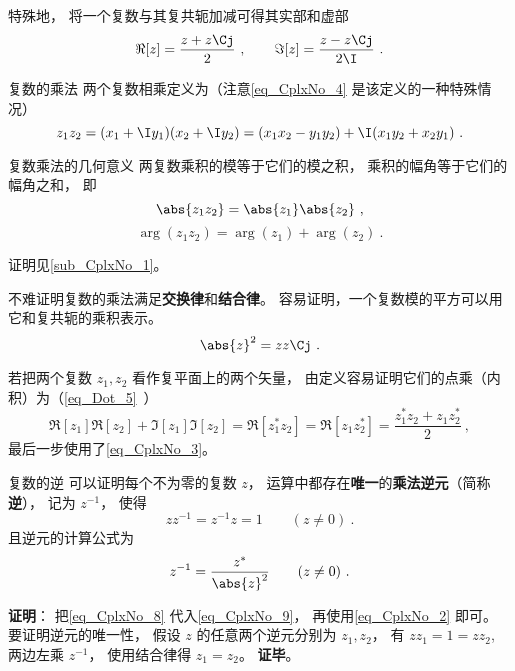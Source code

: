 特殊地， 将一个复数与其复共轭加减可得其实部和虚部
\begin{equation}\label{eq_CplxNo_3}
\Re[z] = \frac{z + z\Cj}{2} ~,\qquad
\Im[z] = \frac{z - z\Cj}{2\I}~.
\end{equation}

\begin{definition}{复数的乘法}
两个复数相乘定义为（注意\autoref{eq_CplxNo_4} 是该定义的一种特殊情况）
\begin{equation}
z_1z_2 = (x_1 + \I y_1)(x_2 + \I y_2) = (x_1 x_2 - y_1 y_2) + \I (x_1 y_2 + x_2 y_1)~.
\end{equation}
\end{definition}

\begin{theorem}{复数乘法的几何意义}
两复数乘积的模等于它们的模之积， 乘积的幅角等于它们的幅角之和， 即
\begin{equation}\label{eq_CplxNo_10}
\abs{z_1 z_2} = \abs{z_1}\abs{z_2}~,
\end{equation}
\begin{equation}
\arg(z_1 z_2) = \arg(z_1) + \arg(z_2)~.
\end{equation}
\end{theorem}
证明见\autoref{sub_CplxNo_1}。

不难证明复数的乘法满足\textbf{交换律}和\textbf{结合律}。 容易证明，一个复数模的平方可以用它和复共轭的乘积表示。
\begin{equation}\label{eq_CplxNo_2}
\abs{z}^2 = z z\Cj~.
\end{equation}

若把两个复数 $z_1, z_2$ 看作复平面上的两个矢量， 由定义容易证明它们的点乘（内积）为（\autoref{eq_Dot_5}~）
\begin{equation}
\Re[z_1] \Re[z_2] + \Im[z_1]\Im[z_2] = \Re[z_1^* z_2] = \Re[z_1 z_2^*] = \frac{z_1^* z_2 + z_1 z_2^*}{2}~,
\end{equation}
最后一步使用了\autoref{eq_CplxNo_3}。

\begin{definition}{复数的逆}
可以证明每个不为零的复数 $z$， 运算中都存在\textbf{唯一}的\textbf{乘法逆元}（简称\textbf{逆}）， 记为 $z^{-1}$， 使得
\begin{equation}\label{eq_CplxNo_9}
zz^{-1} = z^{-1}z = 1 \qquad (z \ne 0)~.
\end{equation}
且逆元的计算公式为
\begin{equation}\label{eq_CplxNo_8}
z^{-1} = \frac{z^*}{\abs{z}^2} \qquad (z \ne 0)~.
\end{equation}
\end{definition}
\textbf{证明}： 把\autoref{eq_CplxNo_8} 代入\autoref{eq_CplxNo_9}， 再使用\autoref{eq_CplxNo_2} 即可。 要证明逆元的唯一性， 假设 $z$ 的任意两个逆元分别为 $z_1, z_2$， 有 $zz_1 = 1 = zz_2$, 两边左乘 $z^{-1}$， 使用结合律得 $z_1 = z_2$。 \textbf{证毕}。

